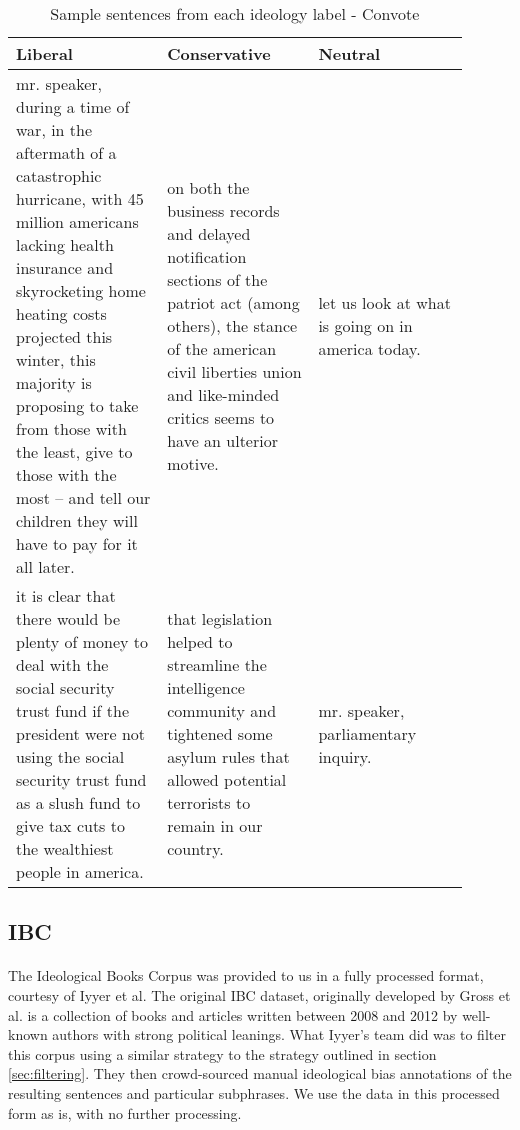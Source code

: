\documentclass[10pt,a4paper,onecolumn]{article}
\begin{document}
\begin{table}[h!]
	\begin{center}
		\caption{Sample sentences from each ideology label - Convote}
		\label{tab:convote-sentences}
		\begin{tabular}{p{0.3\linewidth}|p{0.3\linewidth}|p{0.3\linewidth}}
			\hline\hline
			\textbf{Liberal} & \textbf{Conservative} & \textbf{Neutral}\\
			\hline
			mr. speaker, during a time of war, in the aftermath of a catastrophic hurricane, with 45 million americans lacking health insurance and skyrocketing home heating costs projected this winter, this majority is proposing to take from those with the least, give to those with the most -- and tell our children they will have to pay for it all later. & on both the business records and delayed notification sections of the patriot act (among others), the stance of the american civil liberties union and like-minded critics seems to have an ulterior motive. & let us look at what is going on in america today. \\
			it is clear that there would be plenty of money to deal with the social security trust fund if the president were not using the social security trust fund as a slush fund to give tax cuts to the wealthiest people in america. & that legislation helped to streamline the intelligence community and tightened some asylum rules that allowed potential terrorists to remain in our country. & mr. speaker, parliamentary inquiry. \\
			\hline\hline
		\end{tabular}
	\end{center}
\end{table}

\subsection{IBC}
\paragraph{}
The Ideological Books Corpus was provided to us in a fully processed format, courtesy of Iyyer et al.\cite{iyyerRNN} The original IBC dataset, originally developed by Gross et al.\cite{gross2013ibc} is a collection of books and articles written between 2008 and 2012 by well-known authors with strong political leanings. What Iyyer's team did was to filter this corpus using a similar strategy to the strategy outlined in section \ref{sec:filtering}. They then crowd-sourced manual ideological bias annotations of the resulting sentences and particular subphrases. We use the data in this processed form as is, with no further processing.
\end{document}
